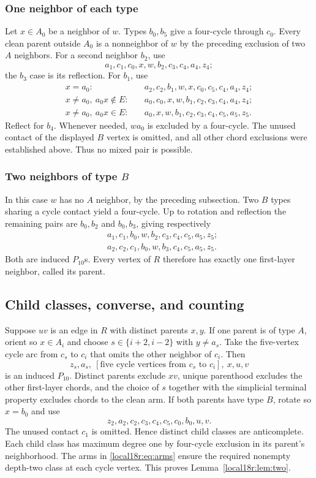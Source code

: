 \documentclass[11pt,a4paper]{article}
\theoremstyle{definition}\newtheorem{definition}[theorem]{Definition}
\theoremstyle{remark}\newtheorem{remark}[theorem]{Remark}
\begin{document}
\subsubsection{One neighbor of each type}
Let $x\in A_0$ be a neighbor of $w$. Types $b_0,b_5$ give a four-cycle
through $c_0$. Every clean parent outside $A_0$ is a nonneighbor of $w$
by the preceding exclusion of two $A$ neighbors.
For a second neighbor $b_2$, use
\[
 a_1,c_1,c_0,x,w,b_2,c_3,c_4,a_4,z_4;
\]
the $b_3$ case is its reflection. For $b_1$, use
\begin{align*}
 x=a_0:&\quad a_2,c_2,b_1,w,x,c_0,c_5,c_4,a_4,z_4;\\
 x\ne a_0,\ a_0x\notin E:&\quad
 a_0,c_0,x,w,b_1,c_2,c_3,c_4,a_4,z_4;\\
 x\ne a_0,\ a_0x\in E:&\quad
 a_0,x,w,b_1,c_2,c_3,c_4,c_5,a_5,z_5.
\end{align*}
Reflect for $b_4$. Whenever needed, $wa_0$ is excluded by a four-cycle.
The unused contact of the displayed $B$ vertex is omitted, and all
other chord exclusions were established above. Thus no mixed pair is
possible.

\subsubsection{Two neighbors of type $B$}
In this case $w$ has no $A$ neighbor, by the preceding subsection.
Two $B$ types sharing a cycle contact yield a four-cycle. Up to rotation
and reflection the remaining pairs are $b_0,b_2$ and $b_0,b_3$, giving
respectively
\begin{align*}
 &a_1,c_1,b_0,w,b_2,c_3,c_4,c_5,a_5,z_5;\\
 &a_2,c_2,c_1,b_0,w,b_3,c_4,c_5,a_5,z_5.
\end{align*}
Both are induced $P_{10}$s. Every vertex of $R$ therefore has exactly
one first-layer neighbor, called its parent.

\subsection{Child classes, converse, and counting}
Suppose $uv$ is an edge in $R$ with distinct parents $x,y$.
If one parent is of type $A$, orient so $x\in A_i$ and choose
$s\in\{i+2,i-2\}$ with $y\ne a_s$. Take the five-vertex cycle arc
from $c_s$ to $c_i$ that omits the other neighbor of $c_i$. Then
\[
 z_s,a_s,\ [\text{five cycle vertices from }c_s\text{ to }c_i],\ x,u,v
\]
is an induced $P_{10}$. Distinct parents exclude $xv$, unique parenthood
excludes the other first-layer chords, and the choice of $s$ together
with the simplicial terminal property excludes chords to the clean arm.
If both parents have type $B$, rotate so $x=b_0$ and use
\[
 z_2,a_2,c_2,c_3,c_4,c_5,c_0,b_0,u,v.
\]
The unused contact $c_1$ is omitted. Hence distinct child classes are
anticomplete. Each child class has maximum degree one by four-cycle
exclusion in its parent's neighborhood. The arms in \eqref{local18r:eq:arms}
ensure the required nonempty depth-two class at each cycle vertex.
This proves Lemma~\ref{local18r:lem:two}.
\end{document}
